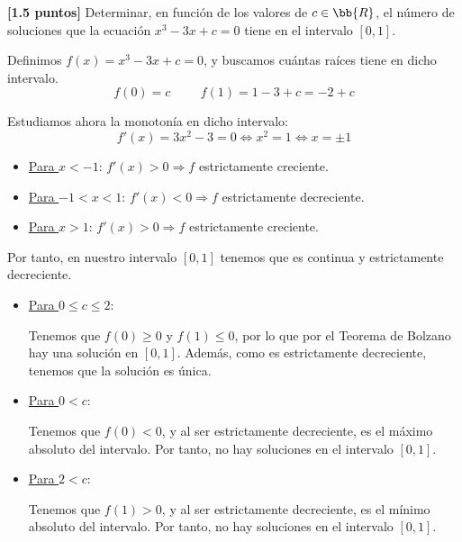 \documentclass[12pt]{article}
\begin{document}
    \begin{ejercicio}\textbf{[1.5 puntos]}
Determinar, en función de los valores de $c\in \bb{R}$, el número de soluciones que la ecuación $x^3-3x+c=0$ tiene en el intervalo $[0,1]$.

Definimos $f(x)=x^3-3x+c=0$, y buscamos cuántas raíces tiene en dicho intervalo.
\begin{equation*}
    f(0)=c \hspace{1cm} f(1)=1-3+c=-2+c
\end{equation*}

Estudiamos ahora la monotonía en dicho intervalo:
\begin{equation*}
    f'(x)=3x^2-3=0 \Longleftrightarrow x^2=1 \Longleftrightarrow x=\pm 1    
\end{equation*}
\begin{itemize}
    \item \underline{Para $x<-1$}: $f'(x)>0\Longrightarrow f$ estrictamente creciente.
    \item \underline{Para $-1<x<1$}: $f'(x)< 0\Longrightarrow f$ estrictamente decreciente.
    \item \underline{Para $x>1$}: $f'(x)>0\Longrightarrow f$ estrictamente creciente.
\end{itemize}

Por tanto, en nuestro intervalo $[0,1]$ tenemos que es continua y estrictamente decreciente.
\begin{itemize}
    \item \underline{Para $0 \leq c \leq 2$}:

    Tenemos que $f(0)\geq 0$ y $f(1)\leq 0$, por lo que por el Teorema de Bolzano hay una solución en $[0,1]$. Además, como es estrictamente decreciente, tenemos que la solución es única.

    \item \underline{Para $0 <c$}:

    Tenemos que $f(0)<0$, y al ser estrictamente decreciente, es el máximo absoluto del intervalo. Por tanto, no hay soluciones en el intervalo $[0,1]$.

    \item \underline{Para $2<c$}:

    Tenemos que $f(1)>0$, y al ser estrictamente decreciente, es el mínimo absoluto del intervalo. Por tanto, no hay soluciones en el intervalo $[0,1]$.
\end{itemize}

\begin{comment}


\end{comment}
\end{ejercicio}
\end{document}
